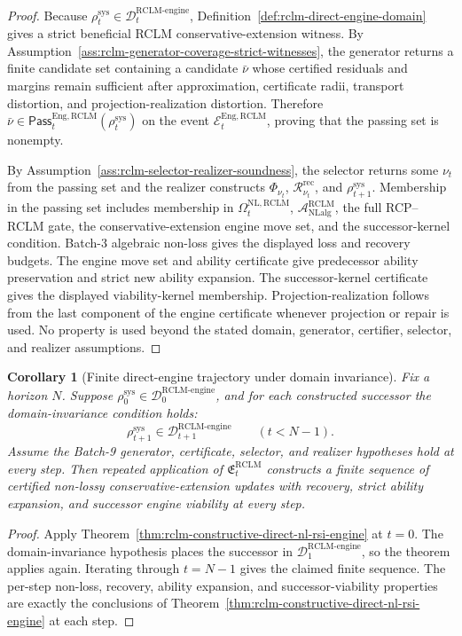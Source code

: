 \documentclass[11pt,a4paper]{article}
\newtheorem{corollary}[theorem]{Corollary}
\newcommand{\Acal}{\mathcal A}
\newcommand{\Ecal}{\mathcal E}
\newcommand{\Dcal}{\mathcal D}
\newcommand{\RCLM}{\mathrm{RCLM}}
\newcommand{\sys}{\mathrm{sys}}
\newcommand{\rec}{\mathrm{rec}}
\newcommand{\engine}{\mathrm{engine}}
\newcommand{\NL}{\mathrm{NL}}
\newcommand{\NLalg}{\mathrm{NLalg}}
\newcommand{\Eng}{\mathrm{Eng}}
\begin{document}
\begin{proof}
Because \(\rho_t^{\sys}\in\Dcal_t^{\RCLM\text{-}\engine}\), Definition~\ref{def:rclm-direct-engine-domain} gives a strict beneficial RCLM conservative-extension witness. By Assumption~\ref{ass:rclm-generator-coverage-strict-witnesses}, the generator returns a finite candidate set containing a candidate \(\bar\nu\) whose certified residuals and margins remain sufficient after approximation, certificate radii, transport distortion, and projection-realization distortion. Therefore \(\bar\nu\in\mathsf{Pass}_t^{\Eng,\RCLM}(\rho_t^{\sys})\) on the event \(\Ecal_t^{\Eng,\RCLM}\), proving that the passing set is nonempty.

By Assumption~\ref{ass:rclm-selector-realizer-soundness}, the selector returns some \(\nu_t\) from the passing set and the realizer constructs \(\Phi_{\nu_t}\), \(\mathcal R_{\nu_t}^{\rec}\), and \(\rho_{t+1}^{\sys}\). Membership in the passing set includes membership in \(\Omega_t^{\NL,\RCLM}\), \(\Acal_{\NLalg}^{\RCLM}\), the full RCP--RCLM gate, the conservative-extension engine move set, and the successor-kernel condition. Batch-3 algebraic non-loss gives the displayed loss and recovery budgets. The engine move set and ability certificate give predecessor ability preservation and strict new ability expansion. The successor-kernel certificate gives the displayed viability-kernel membership. Projection-realization follows from the last component of the engine certificate whenever projection or repair is used. No property is used beyond the stated domain, generator, certifier, selector, and realizer assumptions.
\end{proof}

\begin{corollary}[Finite direct-engine trajectory under domain invariance]
\label{cor:rclm-finite-direct-engine-trajectory}
Fix a horizon \(N\). Suppose \(\rho_0^{\sys}\in\Dcal_0^{\RCLM\text{-}\engine}\), and for each constructed successor the domain-invariance condition holds:
\[
\rho_{t+1}^{\sys}\in\Dcal_{t+1}^{\RCLM\text{-}\engine}
\qquad (t<N-1).
\]
Assume the Batch-9 generator, certificate, selector, and realizer hypotheses hold at every step. Then repeated application of \(\mathfrak E_t^{\RCLM}\) constructs a finite sequence of certified non-lossy conservative-extension updates with recovery, strict ability expansion, and successor engine viability at every step.
\end{corollary}

\begin{proof}
Apply Theorem~\ref{thm:rclm-constructive-direct-nl-rsi-engine} at \(t=0\). The domain-invariance hypothesis places the successor in \(\Dcal_1^{\RCLM\text{-}\engine}\), so the theorem applies again. Iterating through \(t=N-1\) gives the claimed finite sequence. The per-step non-loss, recovery, ability expansion, and successor-viability properties are exactly the conclusions of Theorem~\ref{thm:rclm-constructive-direct-nl-rsi-engine} at each step.
\end{proof}
\end{document}
